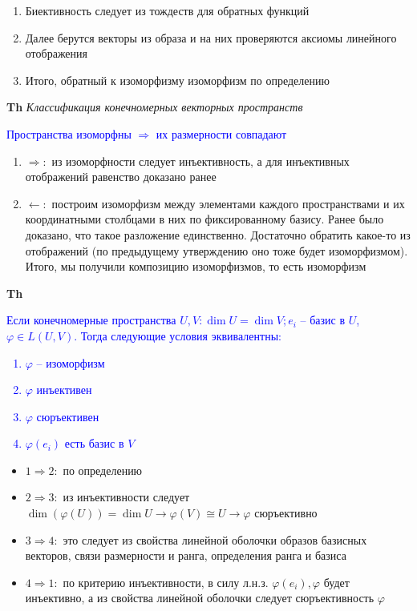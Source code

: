 \begin{enumerate}
    \item Биективность следует из тождеств для обратных функций
    \item Далее берутся векторы из образа и на них проверяются аксиомы линейного отображения
    \item Итого, обратный к изоморфизму изоморфизм по определению
\end{enumerate}

\textbf{Th} \textit{Классификация конечномерных векторных пространств}

\textcolor{blue}{Пространства изоморфны $\Rightarrow$ их размерности совпадают}

\begin{enumerate}
    \item $\Rightarrow:$ из изоморфности следует инъективность, а для инъективных отображений равенство доказано ранее
    \item $\leftarrow:$ построим изоморфизм между элементами каждого пространствами и их координатными столбцами в
    них по фиксированному базису.
    Ранее было доказано, что такое разложение единственно.
    Достаточно обратить какое-то из отображений (по предыдущему утверждению оно тоже будет изоморфизмом).
    Итого, мы получили композицию изоморфизмов, то есть изоморфизм
\end{enumerate}

\textbf{Th} \textcolor{blue}{Если конечномерные пространства $U, V: \dim U = \dim V; e_i$ -- базис в $U$,
    $\varphi \in L(U,V)$. Тогда следующие условия эквивалентны:
    \begin{enumerate}
        \item $\varphi$ -- изоморфизм
        \item $\varphi$ инъективен
        \item $\varphi$ сюръективен
        \item $\varphi (e_i)$ есть базис в $V$
    \end{enumerate}         }

\begin{itemize}
    \item $1 \Rightarrow 2:$ по определению
    \item $2 \Rightarrow 3:$ из инъективности следует $\dim (\varphi(U)) = \dim U \rightarrow \varphi(V) \cong U
    \rightarrow \varphi$ сюръективно
    \item $3 \Rightarrow 4:$ это следует из свойства линейной оболочки образов базисных векторов, связи
    размерности и ранга, определения ранга и базиса
    \item $4 \Rightarrow 1:$ по критерию инъективности, в силу л.н.з. $\varphi (e_i), \varphi$ будет инъективно,
    а из свойства линейной оболочки следует сюръективность $\varphi$
\end{itemize}